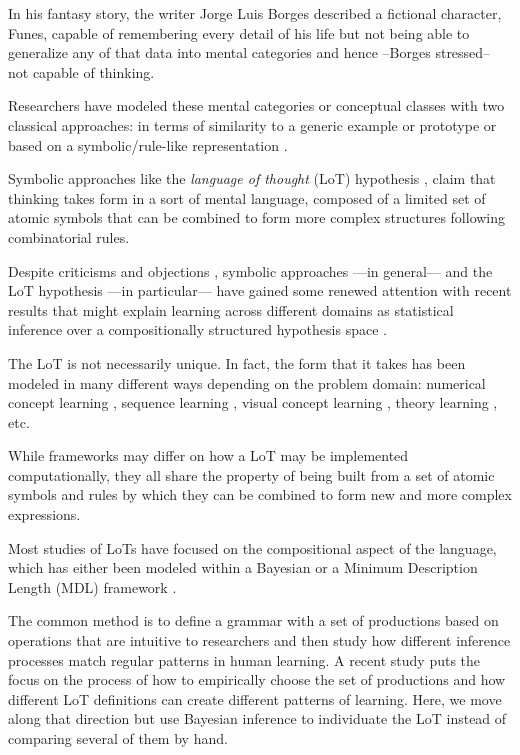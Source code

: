 In his fantasy story, the writer Jorge Luis Borges described a fictional character, Funes, capable of remembering every detail of his life but not being able to generalize any of that data into mental categories and hence --Borges stressed-- not capable of thinking.

Researchers have modeled these mental categories or conceptual classes with two classical approaches: in terms of similarity to a generic example or prototype \cite{rosch1999principles,nosofsky1986attention,rosch1976structural,rosch1975family} or based on a symbolic/rule-like representation \cite{boole1854investigation,fodor1975language,gentner1983structure}.

Symbolic approaches like the \textit{language of thought} (LoT) hypothesis \cite{fodor1975language}, claim that thinking takes form in a sort of mental language, composed of a limited set of atomic symbols that can be combined to form more complex structures following combinatorial rules.

Despite criticisms and objections \cite{blackburn1984spreading,loewer1991meaning,knowles1998language,aydede1997language}, symbolic approaches ---in general--- and the LoT hypothesis ---in particular--- have gained some renewed attention with recent results that might explain learning across different domains as statistical inference over a compositionally structured hypothesis space \cite{tenenbaum2011grow,piantadosi2016four}.

The LoT is not necessarily unique. In fact, the form that it takes has been modeled in many different ways depending on the problem domain:
numerical concept learning \cite{piantadosi2012bootstrapping}, sequence learning \cite{marie2016,yildirim2015learning,romano2013language}, visual concept learning \cite{ellis2015unsupervised}, theory learning \cite{ullman2012theory}, etc.

While frameworks may differ on how a LoT may be implemented computationally, they all share the property of being built from a set of atomic symbols and rules by which they can be combined to form new and more complex expressions.

Most studies of LoTs have focused on the compositional aspect of the language, which has either been modeled within a Bayesian \cite{tenenbaum2011grow} or a Minimum Description Length (MDL) framework \cite{marie2016,goldsmith2002probabilistic,romano2013language,goldsmith2001unsupervised}.

The common method is to define a grammar with a set of productions based on operations that are intuitive to researchers and then study how different inference processes match regular patterns in human learning. A recent study \cite{piantadosi2016logical} puts the focus on the process of how to empirically choose the set of productions and how different LoT definitions can create different patterns of learning. Here, we move along that direction but use Bayesian inference to individuate the LoT instead of comparing several of them by hand.

